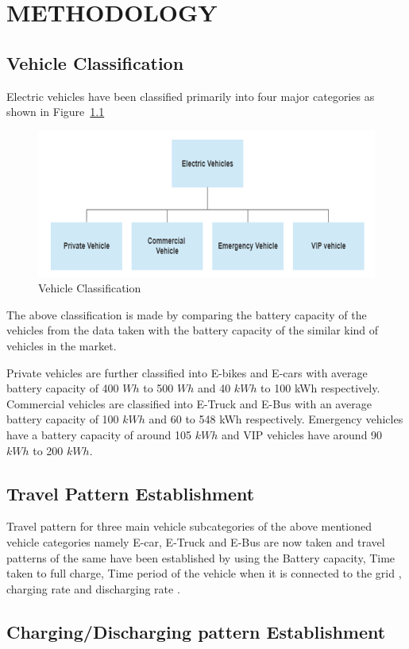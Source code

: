 	\chapter{METHODOLOGY}
	\label{chap:methodology}
	
	\section{Vehicle Classification}
	
	 Electric vehicles have been classified primarily into four major categories as shown in Figure~\ref{fig:classification} 
	 	
			\begin{figure}[h]
				\centering
				\includegraphics[width=0.7\linewidth]{./Figures/classification}
				\caption{Vehicle Classification}
				\label{fig:classification}
			\end{figure}
		
	The above classification is made by comparing the battery capacity of the vehicles from the data taken with the battery capacity of the similar kind of vehicles in the market.

	\par {Private vehicles are further classified into E-bikes and E-cars with average battery capacity of 400 $Wh$ to 500 $Wh$ and 40 $kWh$ to 100 kWh respectively. Commercial vehicles are classified into E-Truck and E-Bus with an average battery capacity of 100 $kWh$ and 60 to 548 kWh respectively. Emergency vehicles have a battery capacity of around 105 $kWh$ and VIP vehicles have around 90 $kWh$ to 200 $kWh$.
	}
	
	\section{Travel Pattern Establishment}
	
	Travel pattern for three main vehicle subcategories of the above mentioned vehicle categories namely E-car, E-Truck and E-Bus are now taken and travel patterns of the same have been established by using the Battery capacity, Time taken to full charge, Time period of the vehicle when it is connected to the grid , charging rate and discharging rate \cite{evdata}.
	
	\section{Charging/Discharging pattern Establishment}